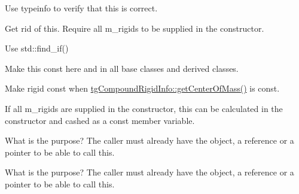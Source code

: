 \begin{DoxyRefList}
\item[\label{todo__todo000012}%
\hypertarget{todo__todo000012}{}%
Member \hyperlink{classtg_bullet_util_a91ab094c3c3cc9ab7402a3618cc75946}{tg\-Bullet\-Util\-:\-:world\-To\-Dynamics\-World} (\hyperlink{classtg_world}{tg\-World} \&world)]Use typeinfo to verify that this is correct.  
\item[\label{todo__todo000069}%
\hypertarget{todo__todo000069}{}%
Member \hyperlink{classtg_compound_rigid_info_a4f908cf4b37888890667c941d7d2fddd}{tg\-Compound\-Rigid\-Info\-:\-:add\-Rigid} (\hyperlink{classtg_rigid_info}{tg\-Rigid\-Info} \&rigid)]Get rid of this. Require all m\-\_\-rigids to be supplied in the constructor.  
\item[\label{todo__todo000065}%
\hypertarget{todo__todo000065}{}%
Member \hyperlink{classtg_compound_rigid_info_a3c82d68ac0347f3a584c2628fdb825cc}{tg\-Compound\-Rigid\-Info\-:\-:contains\-Node} (const bt\-Vector3 \&node\-Vector) const ]Use std\-::find\-\_\-if()  
\item[\label{todo__todo000070}%
\hypertarget{todo__todo000070}{}%
Member \hyperlink{classtg_compound_rigid_info_a16b340c7766ee6fd9397bc78170fca27}{tg\-Compound\-Rigid\-Info\-:\-:get\-Center\-Of\-Mass} () const ]Make this const here and in all base classes and derived classes. 

Make rigid const when \hyperlink{classtg_compound_rigid_info_a16b340c7766ee6fd9397bc78170fca27}{tg\-Compound\-Rigid\-Info\-::get\-Center\-Of\-Mass()} is const. 

If all m\-\_\-rigids are supplied in the constructor, this can be calculated in the constructor and cashed as a const member variable.  
\item[\label{todo__todo000073}%
\hypertarget{todo__todo000073}{}%
Member \hyperlink{classtg_compound_rigid_info_aa3efabdcaaa73b20e8f54f0a9078e7c8}{tg\-Compound\-Rigid\-Info\-:\-:get\-Compound} ()]What is the purpose? The caller must already have the object, a reference or a pointer to be able to call this.  
\item[\label{todo__todo000074}%
\hypertarget{todo__todo000074}{}%
Member \hyperlink{classtg_compound_rigid_info_a7fd1daa19aaaf18b8bc4a6515ad3fe49}{tg\-Compound\-Rigid\-Info\-:\-:get\-Compound} () const ]What is the purpose? The caller must already have the object, a reference or a pointer to be able to call this. 


\end{DoxyRefList}
